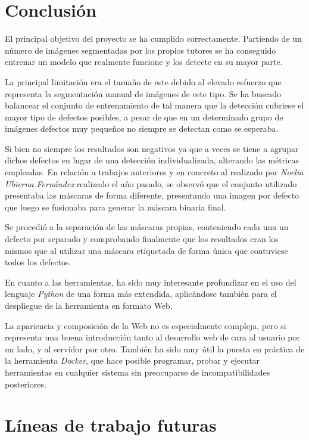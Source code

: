 
\section{Conclusión}
El principal objetivo del proyecto se ha cumplido correctamente. Partiendo de un número de imágenes segmentadas por los propios tutores se ha conseguido entrenar un modelo que realmente funcione y los detecte en su mayor parte. 

La principal limitación era el tamaño de este debido al elevado esfuerzo que representa la segmentación manual de imágenes de este tipo. Se ha buscado balancear el conjunto de entrenamiento de tal manera que la detección cubriese el mayor tipo de defectos posibles, a pesar de que en un determinado grupo de imágenes defectos muy pequeños no siempre se detectan como se esperaba. 

Si bien no siempre los resultados son negativos ya que a veces se tiene a agrupar dichos defectos en lugar de una detección individualizada, alterando las métricas empleadas. En relación a trabajos anteriores y en concreto al realizado por \emph{Noelia Ubierna Fernández} realizado el año pasado, se observó que el conjunto utilizado presentaba las máscaras de forma diferente, presentando una imagen por defecto que luego se fusionaba para generar la máscara binaria final.

Se procedió a la separación de las máscaras propias, conteniendo cada una un defecto por separado y comprobando finalmente que los resultados eran los mismos que al utilizar una máscara etiquetada de forma única que contuviese todos los defectos.

En cuanto a las herramientas, ha sido muy interesante profundizar en el uso del lenguaje \emph{Python} de una forma más extendida, aplicándose también para el despliegue de la herramienta en formato Web. 

La apariencia y composición de la Web no es especialmente compleja, pero si representa una buena introducción tanto al desarrollo web de cara al usuario por un lado, y al servidor por otro. También ha sido muy útil la puesta en práctica de la herramienta \emph{Docker}, que hace posible programar, probar y ejecutar herramientas en cualquier sistema sin preocuparse de incompatibilidades posteriores.


\section{Líneas de trabajo futuras}

